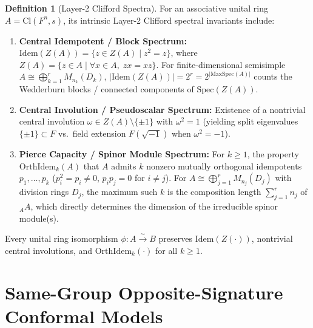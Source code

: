 \documentclass[11pt]{article}
\theoremstyle{definition}
\newtheorem{definition}[theorem]{Definition}
\newcommand{\Cl}{\mathrm{Cl}}
\newcommand{\Spec}{\mathrm{Spec}}
\newcommand{\MaxSpec}{\mathrm{MaxSpec}}
\newcommand{\Idem}{\mathrm{Idem}}
\begin{document}
\begin{definition}[Layer-2 Clifford Spectra]\label{def:clifford-spectra}
For an associative unital ring $A = \Cl(F^n, s)$, its intrinsic Layer-2 Clifford spectral invariants include:
\begin{enumerate}
  \item \textbf{Central Idempotent / Block Spectrum:} $\Idem(Z(A)) = \{z \in Z(A) \mid z^2 = z\}$, where $Z(A) = \{z \in A \mid \forall x \in A,\; zx = xz\}$. For finite-dimensional semisimple $A \cong \bigoplus_{k=1}^r M_{n_k}(D_k)$, $|\Idem(Z(A))| = 2^r = 2^{|\MaxSpec(A)|}$ counts the Wedderburn blocks / connected components of $\Spec(Z(A))$.
  \item \textbf{Central Involution / Pseudoscalar Spectrum:} Existence of a nontrivial central involution $\omega \in Z(A) \setminus \{\pm 1\}$ with $\omega^2 = 1$ (yielding split eigenvalues $\{\pm 1\} \subset F$ vs.\ field extension $F(\sqrt{-1})$ when $\omega^2 = -1$).
  \item \textbf{Pierce Capacity / Spinor Module Spectrum:} For $k \ge 1$, the property $\mathrm{OrthIdem}_k(A)$ that $A$ admits $k$ nonzero mutually orthogonal idempotents $p_1, \dots, p_k$ ($p_i^2 = p_i \neq 0$, $p_i p_j = 0$ for $i \neq j$). For $A \cong \bigoplus_{j=1}^r M_{n_j}(D_j)$ with division rings $D_j$, the maximum such $k$ is the composition length $\sum_{j=1}^r n_j$ of ${}_A A$, which directly determines the dimension of the irreducible spinor module(s).
\end{enumerate}
Every unital ring isomorphism $\phi : A \xrightarrow{\sim} B$ preserves $\Idem(Z(\cdot))$, nontrivial central involutions, and $\mathrm{OrthIdem}_k(\cdot)$ for all $k \ge 1$.
\end{definition}

\section{Same-Group Opposite-Signature Conformal Models}
\end{document}
